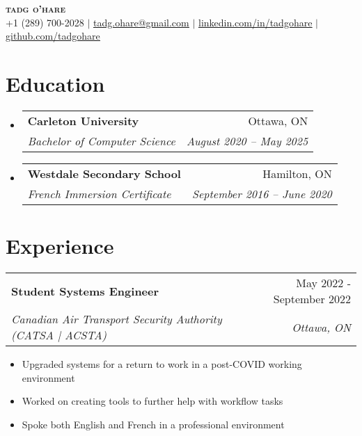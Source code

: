 \documentclass[letterpaper,11pt]{article}
\makeatletter
\newcommand{\resumeItem}[1]{
  \item\small{
    {#1 \vspace{-2pt}}
  }
}
\newcommand{\resumeSubheading}[4]{
  \vspace{-2pt}\item
    \begin{tabular*}{0.97\textwidth}[t]{l@{\extracolsep{\fill}}r}
      \textbf{#1} & #2 \\
      \textit{\small#3} & \textit{\small #4} \\
    \end{tabular*}\vspace{-7pt}
}
\newcommand{\resumeSubSubheading}[2]{
    \item
    \begin{tabular*}{0.97\textwidth}{l@{\extracolsep{\fill}}r}
      \textit{\small#1} & \textit{\small #2} \\
    \end{tabular*}\vspace{-7pt}
}
\newcommand{\resumeSubHeadingListStart}{\begin{itemize}[leftmargin=0.15in, label={}]}
\newcommand{\resumeSubHeadingListEnd}{\end{itemize}}
\newcommand{\resumeItemListStart}{\begin{itemize}}
\newcommand{\resumeItemListEnd}{\end{itemize}\vspace{-5pt}}
\makeatother
\begin{document}

\begin{center}
    \textbf{\Huge \scshape tadg o'hare} \\ \vspace{1pt}
    \small +1 (289) 700-2028 $|$ \href{mailto:tadg.ohare@gmail.com}{\underline{tadg.ohare@gmail.com}} $|$ 
    \href{https://linkedin.com/in/tadgohare}{\underline{linkedin.com/in/tadgohare}} $|$
    \href{https://github.com/tadgohare}{\underline{github.com/tadgohare}}
\end{center}


\section{Education}
  \resumeSubHeadingListStart
    \resumeSubheading
      {Carleton University}{Ottawa, ON}
      {Bachelor of Computer Science}{August 2020 -- May 2025}
    \resumeSubheading
      {Westdale Secondary School}{Hamilton, ON}
      {French Immersion Certificate}{September 2016 -- June 2020}
  \resumeSubHeadingListEnd

\section{Experience}

    \resumeSubheading
      {Student Systems Engineer}{May 2022 - September 2022}
      {Canadian Air Transport Security Authority (CATSA | ACSTA)}{Ottawa, ON}
      \resumeItemListStart
        \resumeItem{Upgraded systems for a return to work in a post-COVID working environment}
        \resumeItem{Worked on creating tools to further help with workflow tasks}
        \resumeItem{Spoke both English and French in a professional environment}
      \resumeItemListEnd
      
\end{document}
